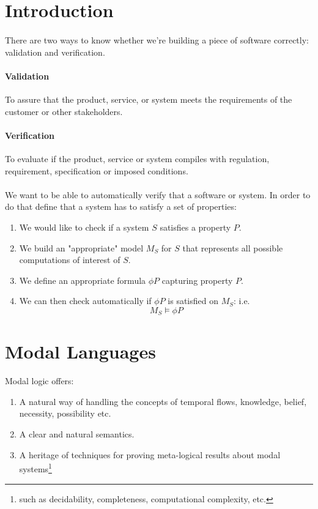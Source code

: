 \documentclass{article}
\theoremstyle{plain}
\theoremstyle{definition}
\begin{document}
\begin{multicols}{2}
\tableofcontents
\newpage

\section{Introduction}

\paragraph{} There are two ways to know whether we're building a piece of software correctly: validation and verification.

\paragraph{Validation} To assure that the product, service, or system meets the requirements of the customer or other stakeholders.
\paragraph{Verification} To evaluate if the product, service or system compiles with regulation, requirement, specification or imposed conditions.

\paragraph{} We want to be able to automatically verify that a software or system. In order to do that define that a system has to satisfy a set of properties:

\begin{enumerate}
\item We would like to check if a system $S$ satisfies a property $P$.
\item We build an "appropriate" model $M_S$ for $S$ that represents all possible computations of interest of $S$.
\item We define an appropriate formula $\phi P$ capturing property $P$.
\item We can then check automatically if $\phi P$ is satisfied on $M_S$: i.e. $$M_S \models \phi P$$
\end{enumerate}

\section{Modal Languages}

\paragraph{} Modal logic offers:
\begin{enumerate}
\item A natural way of handling the concepts of temporal flows, knowledge, belief, necessity, possibility etc.
\item A clear and natural semantics.
\item A heritage of techniques for proving meta-logical results about modal systems\footnote{such as decidability, completeness, computational complexity, etc.}
\end{enumerate}


\end{multicols}
\end{document}
